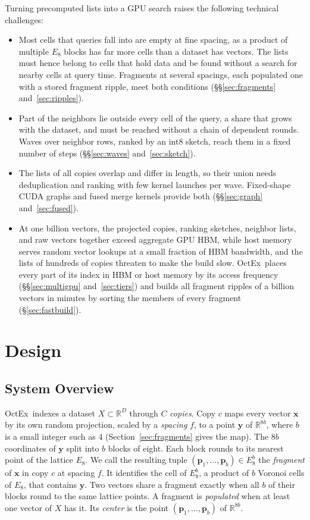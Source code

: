 \documentclass[letterpaper,twocolumn,10pt]{article}
\newcommand{\sysname}{OctEx}
\begin{document}
Turning precomputed lists into a GPU search raises the following technical challenges:
\begin{itemize}
  \item Most cells that queries fall into are empty at fine spacing, as a product of multiple $E_8$ blocks has far more cells than a dataset has vectors. The lists must hence belong to cells that hold data and be found without a search for nearby cells at query time. Fragments at several spacings, each populated one with a stored fragment ripple, meet both conditions (\S\S\ref{sec:fragments} and~\ref{sec:ripples}).
  \item Part of the neighbors lie outside every cell of the query, a share that grows with the dataset, and must be reached without a chain of dependent rounds. Waves over neighbor rows, ranked by an int8 sketch, reach them in a fixed number of steps (\S\S\ref{sec:waves} and~\ref{sec:sketch}).
  \item The lists of all copies overlap and differ in length, so their union needs deduplication and ranking with few kernel launches per wave. Fixed-shape CUDA graphs and fused merge kernels provide both (\S\S\ref{sec:graph} and~\ref{sec:fused}).
  \item At one billion vectors, the projected copies, ranking sketches, neighbor lists, and raw vectors together exceed aggregate GPU HBM, while host memory serves random vector lookups at a small fraction of HBM bandwidth, and the lists of hundreds of copies threaten to make the build slow. \sysname\ places every part of its index in HBM or host memory by its access frequency (\S\S\ref{sec:multigpu} and~\ref{sec:tiers}) and builds all fragment ripples of a billion vectors in minutes by sorting the members of every fragment (\S\ref{sec:fastbuild}).
\end{itemize}

\section{Design}
\label{sec:design}

\subsection{System Overview}
\label{sec:overview}

\sysname\ indexes a dataset $X \subset \mathbb{R}^D$ through $C$ \emph{copies}. Copy $c$ maps every vector $\mathbf{x}$ by its own random projection, scaled by a \emph{spacing} $f$, to a point $\mathbf{y}$ of $\mathbb{R}^{8b}$, where $b$ is a small integer such as 4 (Section~\ref{sec:fragments} gives the map). The $8b$ coordinates of $\mathbf{y}$ split into $b$ blocks of eight. Each block rounds to its nearest point of the lattice $E_8$. We call the resulting tuple $(\mathbf{p}_1, \dots, \mathbf{p}_b) \in E_8^b$ the \emph{fragment} of $\mathbf{x}$ in copy $c$ at spacing $f$. It identifies the cell of $E_8^b$, a product of $b$ Voronoi cells of $E_8$, that contains $\mathbf{y}$. Two vectors share a fragment exactly when all $b$ of their blocks round to the same lattice points. A fragment is \emph{populated} when at least one vector of $X$ has it. Its \emph{center} is the point $(\mathbf{p}_1, \dots, \mathbf{p}_b)$ of $\mathbb{R}^{8b}$.
\end{document}
